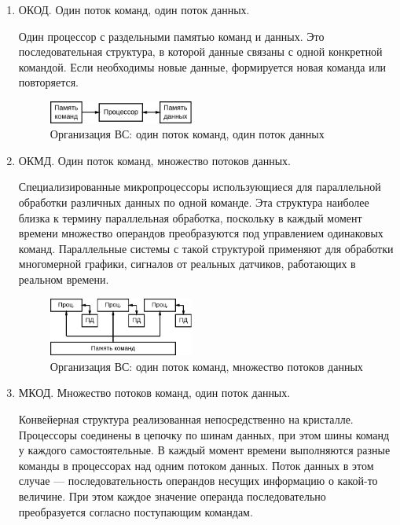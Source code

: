 \documentclass[unicode, 12pt, a4paper, oneside]{article}
\begin{document}
\begin{enumerate}
\item ОКОД. Один поток команд, один поток данных.

Один процессор с раздельными памятью команд и данных. Это последовательная структура, в которой данные связаны с одной конкретной командой. Если необходимы новые данные, формируется новая команда или повторяется.

\begin{figure}[H]
\centering
\includegraphics[width=0.45\textwidth]{152_okod.pdf}
\caption{Организация ВС: один поток команд, один поток данных}
\end{figure}

\item ОКМД. Один поток команд, множество потоков данных.

Специализированные микропроцессоры использующиеся для параллельной обработки различных данных по одной команде. Эта структура наиболее близка к термину параллельная обработка, поскольку в каждый момент времени множество операндов преобразуются под управлением одинаковых команд. Параллельные системы с такой структурой применяют для обработки многомерной графики, сигналов от реальных датчиков, работающих в реальном времени.

\begin{figure}[H]
\centering
\includegraphics[width=0.45\textwidth]{152_okmd.pdf}
\caption{Организация ВС: один поток команд, множество потоков данных}
\end{figure}

\item МКОД. Множество потоков команд, один поток данных.

Конвейерная структура реализованная непосредственно на кристалле. Процессоры соединены в цепочку по шинам данных, при этом шины команд у каждого самостоятельные. В каждый момент времени выполняются разные команды в процессорах над одним потоком данных. Поток данных в этом случае --- последовательность операндов несущих информацию о какой-то величине. При этом каждое значение операнда последовательно преобразуется согласно поступающим командам.


\end{enumerate}
\end{document}
